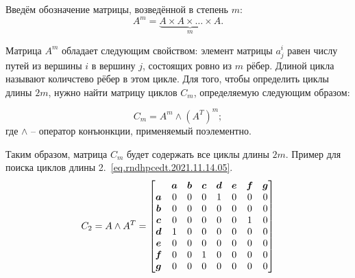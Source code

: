 Введём обозначение матрицы, возведённой в степень $m$:
\begin{equation}\label{eq.rndhpcedt.2021.11.14.03}
A^m=\underbrace{A\times A \times \ldots \times A}_{m}.
\end{equation}

Матрица $A^m$ обладает следующим свойством: элемент матрицы $a^i_j$ равен числу путей из вершины $i$ в вершину $j$, состоящих ровно из $m$ рёбер\cite{diestel2012graph}. 
Длиной цикла называют количстево рёбер в этом цикле.
Для того, чтобы определить циклы длины $2m$, нужно найти матрицу циклов $C_m$, определяемую следующим образом: 

\begin{equation}\label{eq.rndhpcedt.2021.11.14.04}
    C_m = A^m \wedge (A^T)^m;
\end{equation}
где $\wedge$ -- оператор конъюнкции, применяемый поэлементно.

Таким образом, матрица $C_m$ будет содержать все циклы длины $2m$.
Пример для поиска циклов длины 2.~\ref{eq.rndhpcedt.2021.11.14.05}.
\begin{equation}\label{eq.rndhpcedt.2021.11.14.05}
	C_2 = A \wedge A^T = %
	\begin{bmatrix}
		&	\bs{a}	&	\bs{b}	&	\bs{c}	&	\bs{d}	&	\bs{e}	&	\bs{f}	&	\bs{g} \\
	\bs{a}	&	0	&	0	&	0	& 	1	& 	0	& 	0	 & 	0 \\
	\bs{b}	&	0	&	0	&	0	& 	0	& 	0	& 	0	 & 	0 \\
	\bs{c}	&	0	&	0	&	0	& 	0	& 	0	& 	1	 & 	0 \\
	\bs{d}	&	1	&	0	&	0	& 	0	& 	0	& 	0	 & 	0 \\
	\bs{e}	&	0	&	0	&	0	& 	0	& 	0	& 	0	 & 	0 \\
	\bs{f}	&	0	&	0	&	1	& 	0	& 	0	& 	0	 & 	0 \\
	\bs{g}	&	0	&	0	&	0	& 	0	& 	0	& 	0	 & 	0 \\
	\end{bmatrix}
	\end{equation}

\noteattributes{}
